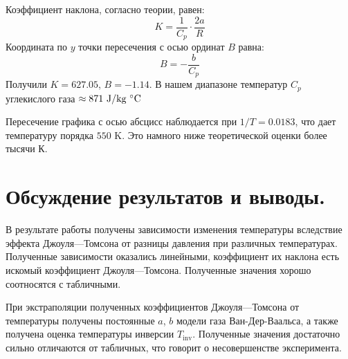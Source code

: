 \documentclass[a4paper,12pt]{report}
\begin{document}
\begin{multicols}{2}
        Коэффициент наклона, согласно теории, равен:
        \begin{equation*}
            K=\frac{1}{C_p}\cdot \frac{2a}{R}
        \end{equation*}
        Координата по $y$ точки пересечения с осью ординат $B$ равна:
        \begin{equation*}
            B=-\frac{b}{C_p}
        \end{equation*}
        Получили $K=627.05$, $B=-1.14$. В нашем диапазоне температур $C_p$ углекислого газа $\approx 871\ \text{J}/\text{kg}\ \celsius$

        Пересечение графика с осью абсцисс наблюдается при $1/T=0.0183$, что дает температуру порядка $550$ K. Это намного ниже теоретической оценки более тысячи К.
        \section{Обсуждение результатов и выводы.}
        В результате работы получены зависимости изменения температуры вследствие эффекта Джоуля---Томсона от разницы давления при различных температурах. Полученные зависимости оказались линейными, коэффициент их наклона есть искомый коэффициент Джоуля---Томсона. Полученные значения хорошо соотносятся с табличными.

        При экстраполяции полученных коэффициентов Джоуля---Томсона от температуры получены постоянные $a$, $b$ модели газа Ван-Дер-Ваальса, а также получена оценка температуры инверсии $T_\text{inv}$. Полученные значения достаточно сильно отличаются от табличных, что говорит о несовершенстве эксперимента.
    \end{multicols}
\end{document}
